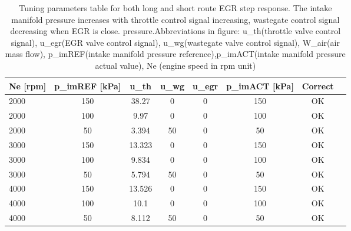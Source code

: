 
\begin{table}
\centering
\vspace{1ex}
\begin{tabular}
{l*{6}{c}r} Ne [rpm] & p\_imREF [kPa] & u\_th & u\_wg & u\_egr &  p\_imACT [kPa] & Correct \\ \hline 2000 & 150 & 38.27 & 0 & 0 & 150 & OK  \\ 2000 & 100 & 9.97 & 0 & 0 & 100 & OK  \\ 2000 & 50 & 3.394 & 50 & 0 & 50 & OK  \\ 3000 & 150 & 13.323 & 0 & 0 & 150 & OK  \\ 3000 & 100 & 9.834 & 0 & 0 & 100 & OK  \\ 3000 & 50 & 5.794 & 50 & 0 & 50 & OK \\ 4000 & 150 & 13.526 & 0 & 0 & 150 & OK  \\ 4000 & 100 & 10.1 & 0 & 0 & 100 & OK \\ 4000 & 50 & 8.112 & 50 & 0 & 50 & OK \\
\end{tabular}
\label{fig:table_short_tune}
\caption{Tuning parameters table for both long and short route EGR step response. The intake manifold pressure increases with throttle control signal increasing, wastegate control signal decreasing when EGR is close.  pressure.Abbreviations in figure: u\_th(throttle valve control signal), u\_egr(EGR valve control signal), u\_wg(wastegate valve control signal), W\_air(air mass flow), p\_imREF(intake manifold pressure reference),p\_imACT(intake manifold pressure actual value), Ne (engine speed in rpm unit)} 
\end{table}

